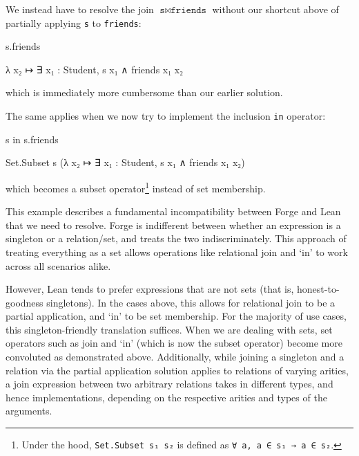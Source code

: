 We instead have to resolve the join $\texttt{s} \bowtie \texttt{friends}$ without our shortcut above of partially applying \texttt{s} to \texttt{friends}: 

\vspace{0.5em}
\noindent\begin{minipage}{0.3\textwidth}
\begin{forge*}
s.friends
\end{forge*}
\end{minipage}%
\begin{minipage}{0.7\textwidth}
\begin{lean*}
λ x₂ ↦ ∃ x₁ : Student, s x₁ ∧ friends x₁ x₂
\end{lean*}
\end{minipage}
\vspace{0.5em}\newline
which is immediately more cumbersome than our earlier solution. 

The same applies when we now try to implement the inclusion \texttt{in} operator: 

\vspace{0.5em}
\noindent\begin{minipage}{0.3\textwidth}
\begin{forge*}
s in s.friends
\end{forge*}
\end{minipage}%
\begin{minipage}{0.7\textwidth}
\begin{lean*}
Set.Subset s (λ x₂ ↦ ∃ x₁ : Student, s x₁ ∧ friends x₁ x₂)
\end{lean*}
\end{minipage}
\vspace{0.5em}\newline
which becomes a subset operator\footnote{Under the hood, \texttt{Set.Subset s₁ s₂} is defined as \texttt{∀ a, a ∈ s₁ → a ∈ s₂}.} instead of set membership. 

This example describes a fundamental incompatibility between Forge and Lean that we need to resolve. Forge is indifferent between whether an expression is a singleton or a relation/set, and treats the two indiscriminately. This approach of treating everything as a set allows operations like relational join and `in' to work across all scenarios alike. 

However, Lean tends to prefer expressions that are not sets (that is, honest-to-goodness singletons). In the cases above, this allows for relational join to be a partial application, and `in' to be set membership. For the majority of use cases, this singleton-friendly translation suffices. When we are dealing with sets, set operators such as join and `in' (which is now the subset operator) become more convoluted as demonstrated above. Additionally, while joining a singleton and a relation via the partial application solution applies to relations of varying arities, a join expression between two arbitrary relations takes in different types, and hence implementations, depending on the respective arities and types of the arguments. 

